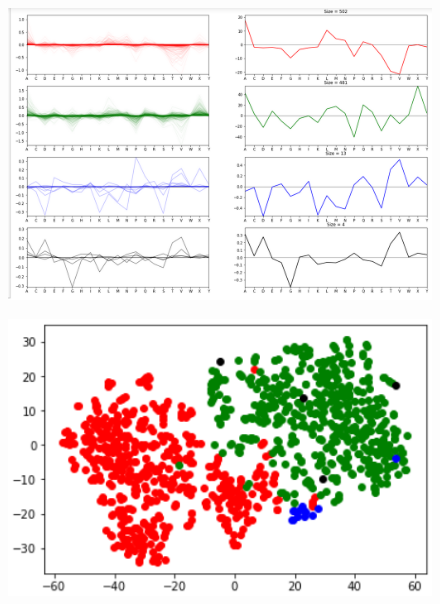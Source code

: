 		\begin{figure}
		\centering
		\includegraphics[width=1\linewidth]{Figures/clusters}
		\caption{}
		\label{fig:clusters}
		\end{figure}
		
		\begin{figure}
		\centering
		\includegraphics[width=0.7\linewidth]{tsne}
		\caption{}
		\label{fig:tsne}
		\end{figure}

